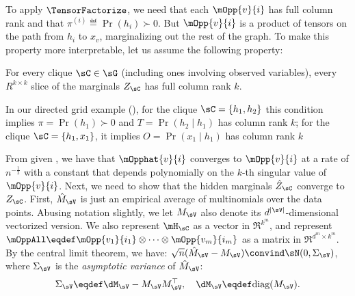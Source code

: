 To apply $\TensorFactorize$, we need that each $\mOpp{v}{i}$ has full
  column rank and that $\pi^{(i)} \eqdef \Pr(h_i) \succ 0$.
But $\mOpp{v}{i}$ is a product of
tensors on the path from $h_i$ to $x_v$, marginalizing out the rest of the graph.
To make this property more interpretable, let us assume the following property:%
\begin{assumption} 
\label{asm:full-rank-plus}
For every clique $\sC \in \sG$ (including ones involving observed variables),
every $R^{k \times k}$ slice of the marginals $Z_\sC$ has full column rank $k$.
\end{assumption}
In our directed grid example (), for the clique $\sC = \{ h_1, h_2 \}$ this
  condition implies $\pi = \Pr(h_1) \succ 0$ and $T = \Pr(h_2 \mid h_1)$ has column rank $k$; 
for the clique $\sC = \{ h_1, x_1 \}$, it implies $O = \Pr(x_1 \mid h_1)$ has column rank $k$ 


From \citet{anandkumar13tensor} given ,
we have that $\mOpphat{v}{i}$ converges to $\mOpp{v}{i}$ at a rate of $n^{-\frac12}$ with a constant that
depends polynomially on the $k$-th singular value of $\mOpp{v}{i}$.
Next, we need to show that the hidden marginals $\hat Z_\sC$ converge to $Z_\sC$.
First, $\hat M_\sV$ is just an empirical average of multinomials over the data points.
Abusing notation slightly, we let $M_\sV$ also denote its $d^{|\sV|}$-dimensional vectorized version.
We also represent $\mH_\sC$ as
  a vector in $\Re^{k^m}$, and represent $\mOppAll \eqdef
  \mOpp{v_1}{i_1} \otimes \cdots \otimes
  \mOpp{v_m}{i_m}$ as a matrix in $\Re^{d^m \times
  k^m}$.
By the central limit theorem, we have:
$\sqrt{n} (\hat M_\sV - M_\sV) \convind \sN(0, \Sigma_\sV)$,
where $\Sigma_\sV$ is the \emph{asymptotic variance} of $\hat M_\sV$: 
\begin{align*}
\Sigma_\sV \eqdef \dM_\sV - M_\sV M_\sV^\top, \quad \dM_\sV \eqdef \text{diag}(M_\sV).
\end{align*}

